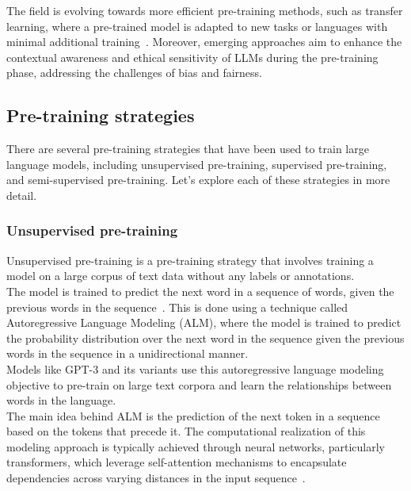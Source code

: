 The field is evolving towards more efficient pre-training methods, such as transfer learning, where a pre-trained model is adapted to new tasks or languages with minimal additional training~\cite{ruder2019transfer}.
Moreover, emerging approaches aim to enhance the contextual awareness and ethical sensitivity of LLMs during the pre-training phase, addressing the challenges of bias and fairness.

\subsection{Pre-training strategies}
\label{subsec:pre-training-strategies}

There are several pre-training strategies that have been used to train large language models, including unsupervised pre-training, supervised pre-training, and semi-supervised pre-training.
Let's explore each of these strategies in more detail.

\subsubsection{Unsupervised pre-training}
\label{subsubsec:unsupervised-pre-training}

Unsupervised pre-training is a pre-training strategy that involves training a model on a large corpus of text data without any labels or annotations.\\
The model is trained to predict the next word in a sequence of words, given the previous words in the sequence~\cite{brown2020language}.
This is done using a technique called Autoregressive Language Modeling (ALM), where the model is trained to predict the probability distribution over the next word in the sequence given the previous words in the sequence in a unidirectional manner.\\
Models like GPT-3 and its variants use this autoregressive language modeling objective to pre-train on large text corpora and learn the relationships between words in the language.\\
The main idea behind ALM is the prediction of the next token in a sequence based on the tokens that precede it.
The computational realization of this modeling approach is typically achieved through neural networks, particularly transformers, which leverage self-attention mechanisms to encapsulate dependencies across varying distances in the input sequence~\cite{vaswani2023attention}.

